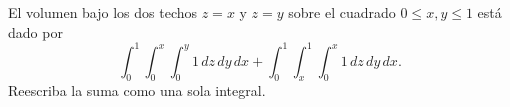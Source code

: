 El volumen bajo los dos techos $z=x$ y $z=y$ sobre el cuadrado $0\leq x,y\leq1$ está dado por
\[
\int_0^1\int_0^x\int_0^y1\,dz\,dy\,dx
+\int_0^1\int_x^1\int_0^x1\,dz\,dy\,dx.
\]
Reescriba la suma como una sola integral.